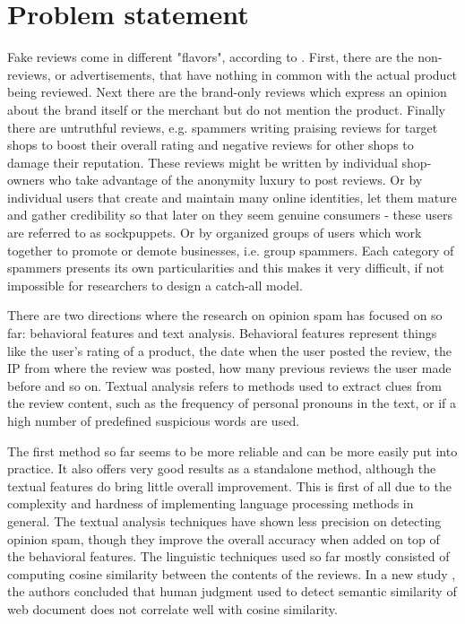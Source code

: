 \section{Problem statement}

Fake reviews come in different "flavors", according to \citet{Jindal2008}. First, there are the non-reviews, or advertisements, that have nothing in common with the actual product being reviewed. Next there are the brand-only reviews which express an opinion about the brand itself or the merchant but do not mention the product. Finally there are untruthful reviews, e.g. spammers writing praising reviews for target shops to boost their overall rating and negative reviews for other shops to damage their reputation. These reviews might be written by individual shop-owners who take advantage of the anonymity luxury to post reviews. Or by individual users that create and maintain many online identities, let them mature and gather credibility so that later on they seem genuine consumers - these users are referred to as sockpuppets. Or by organized groups of users which work together to promote or demote businesses, i.e. group spammers. Each category of spammers presents its own particularities and this makes it very difficult, if not impossible for researchers to design a catch-all model.

There are two directions where the research on opinion spam has focused on so far: behavioral features and text analysis. Behavioral features represent things like the user's rating of a product, the date when the user posted the review, the IP from where the review was posted, how many previous reviews the user made before and so on. Textual analysis refers to methods used to extract clues from the review content, such as the frequency of personal pronouns in the text, or if a high number of predefined suspicious words are used. 

The first method so far seems to be more reliable and can be more easily put into practice. It also offers very good results as a standalone method, although the textual features do bring little overall improvement. This is first of all due to the complexity and hardness of implementing language processing methods in general. The textual analysis techniques have shown less precision on detecting opinion spam, though they improve the overall accuracy when added on top of the behavioral features. The linguistic techniques used so far mostly consisted of computing cosine similarity between the contents of the reviews. In a new study \citet{Zengin2013}, the authors concluded that human judgment used to detect semantic similarity of web document does not correlate well with cosine similarity.


